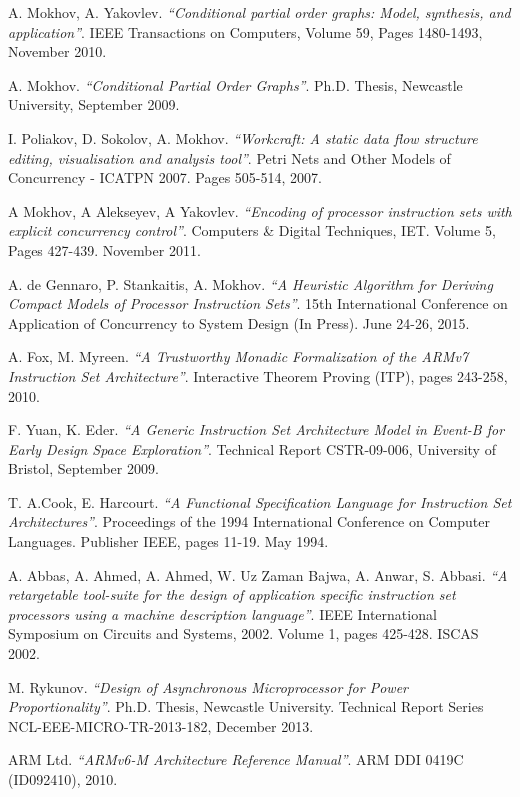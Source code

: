 \documentclass[conference]{IEEEtran}
\begin{document}
\begin{thebibliography}{1}

	A. Mokhov, A. Yakovlev. \emph{``Conditional partial order graphs: Model, synthesis, and application''}. IEEE Transactions on Computers, Volume 59, Pages 1480-1493, November 2010.
	
	A. Mokhov. \emph{``Conditional Partial Order Graphs''}. Ph.D. Thesis, Newcastle University, September 2009.	

	I. Poliakov, D. Sokolov, A. Mokhov. \emph{``Workcraft: A static data flow structure editing, visualisation and analysis tool''}. Petri Nets and Other Models of Concurrency - ICATPN 2007. Pages 505-514, 2007.
	
	A Mokhov, A Alekseyev, A Yakovlev. \emph{``Encoding of processor instruction sets with explicit concurrency control''}. Computers \& Digital Techniques, IET. Volume 5, Pages 427-439. November 2011.
	
	A. de Gennaro, P. Stankaitis, A. Mokhov. \emph{``A Heuristic Algorithm for Deriving Compact Models of Processor Instruction Sets''}. 15th International Conference on Application of Concurrency to System Design (In Press). June 24-26, 2015.

	A. Fox, M. Myreen. \emph{``A Trustworthy Monadic Formalization of the ARMv7 Instruction Set Architecture''}. Interactive Theorem Proving (ITP), pages 243-258, 2010.	
	
	F. Yuan, K. Eder. \emph{``A Generic Instruction Set Architecture Model in Event-B
for Early Design Space Exploration''}. Technical Report CSTR-09-006, University of
Bristol, September 2009.

	T. A.Cook, E. Harcourt. \emph{``A Functional Specification Language for Instruction Set Architectures''}. Proceedings of the 1994 International Conference on Computer Languages. Publisher IEEE, pages 11-19. May 1994.
	
	A. Abbas, A. Ahmed, A. Ahmed, W. Uz Zaman Bajwa, A. Anwar, S. Abbasi. \emph{``A retargetable tool-suite for the design of application specific instruction set processors using a machine description language''}. IEEE International Symposium on Circuits and Systems, 2002. Volume 1, pages 425-428. ISCAS 2002.
	
	M. Rykunov. \emph{``Design of Asynchronous Microprocessor for Power Proportionality''}. Ph.D. Thesis, Newcastle University. Technical Report Series	NCL-EEE-MICRO-TR-2013-182, December 2013.
	
	ARM Ltd. \emph{``ARMv6-M Architecture Reference Manual''}. ARM DDI 0419C (ID092410), 2010.
	
\end{thebibliography}
\end{document}
